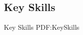 \documentclass[letterpaper,MMMyyyy,nonstop]{simpleresumecv}
\begin{document}
\begin{body}





%
%
%
%


\section
{Key Skills}
{Key Skills}
{PDF:KeySkills}


\end{body}
\end{document}
